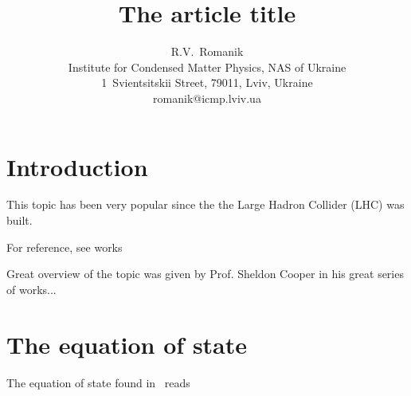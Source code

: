 \documentclass[12pt]{article}
\title{The article title}
\author{R.V.~Romanik
	\\ \small Institute for Condensed Matter Physics, NAS of Ukraine 
	\\ \small 1~Svientsitskii Street, 79011, Lviv, Ukraine 
	\\ \small romanik@icmp.lviv.ua}
\begin{document}
	
	\maketitle
	
	
	\section{Introduction}
	This topic has been very popular since the the Large Hadron Collider (LHC) was built.
	
	For reference, see works~\cite{Cooper} \nocite{*}
	
	Great overview of the topic was given by Prof. Sheldon Cooper in his great series of works...
	
	\section{The equation of state}
	The equation of state found in~\cite{KozitskyKozlovskiiDobush2020} reads
	
	
	
	
\end{document}
